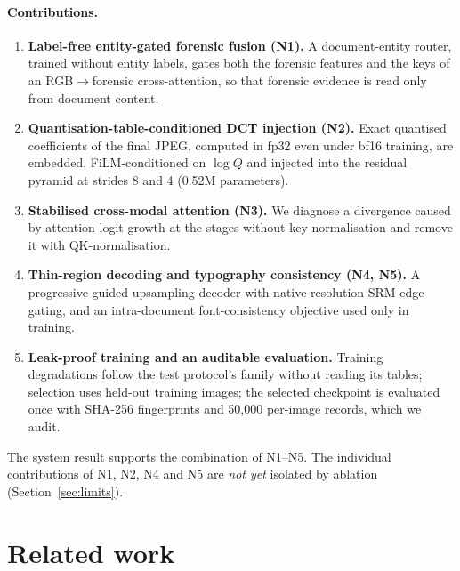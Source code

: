 \documentclass[11pt,a4paper]{article}
\begin{document}
\paragraph{Contributions.}
\begin{enumerate}[label=(\arabic*)]
  \item \textbf{Label-free entity-gated forensic fusion (N1).} A document-entity router,
        trained without entity labels, gates both the forensic features and the keys of an
        RGB$\rightarrow$forensic cross-attention, so that forensic evidence is read only from
        document content.
  \item \textbf{Quantisation-table-conditioned DCT injection (N2).} Exact quantised
        coefficients of the final JPEG, computed in fp32 even under bf16 training, are embedded,
        FiLM-conditioned on $\log Q$ and injected into the residual pyramid at strides 8 and 4
        (0.52M parameters).
  \item \textbf{Stabilised cross-modal attention (N3).} We diagnose a divergence caused by
        attention-logit growth at the stages without key normalisation and remove it with
        QK-normalisation.
  \item \textbf{Thin-region decoding and typography consistency (N4, N5).} A progressive guided
        upsampling decoder with native-resolution SRM edge gating, and an intra-document
        font-consistency objective used only in training.
  \item \textbf{Leak-proof training and an auditable evaluation.} Training degradations follow
        the test protocol's family without reading its tables; selection uses held-out training
        images; the selected checkpoint is evaluated once with SHA-256 fingerprints and 50{,}000
        per-image records, which we audit.
\end{enumerate}
The system result supports the combination of N1--N5. The individual contributions of N1, N2,
N4 and N5 are \emph{not yet} isolated by ablation (Section~\ref{sec:limits}).

\section{Related work}\label{sec:related}
\end{document}
